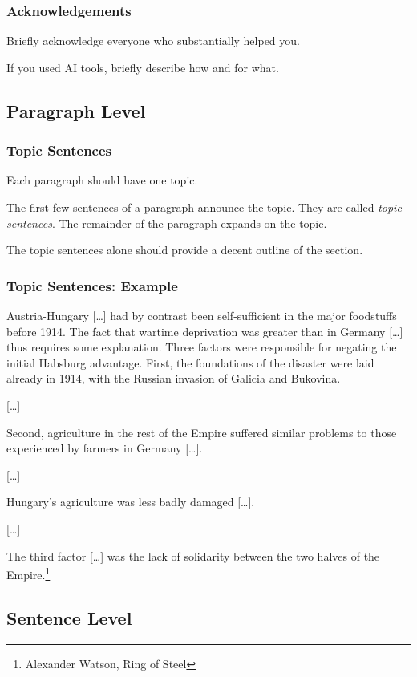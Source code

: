 \documentclass[xetex]{beamer}
\begin{document}
\begin{frame}
  \frametitle{Acknowledgements}

  Briefly acknowledge everyone who substantially helped you.

  \medskip

  If you used AI tools, briefly describe how and for what.
\end{frame}

\subsection{Paragraph Level}

\begin{frame}
  \frametitle{Topic Sentences}

  Each paragraph should have one topic.

  \medskip

  The first few sentences of a paragraph announce the topic.
  They are called \emph{topic sentences}.
  The remainder of the paragraph expands on the topic.

  \medskip

  The topic sentences alone should provide a decent outline of the section.
\end{frame}

\begin{frame}
  \frametitle{Topic Sentences: Example}

  \small
  Austria-Hungary [\dots] had by contrast been self-sufficient in the major foodstuffs before 1914.
  The fact that wartime deprivation was greater than in Germany [\dots] thus requires some explanation.
  Three factors were responsible for negating the initial Habsburg advantage.
  First, the foundations of the disaster were laid already in 1914, with the Russian invasion of Galicia and Bukovina.

  [\dots]

  Second, agriculture in the rest of the Empire suffered similar problems to those experienced by farmers in Germany [\dots].

  [\dots]

  Hungary's agriculture was less badly damaged [\dots].

  [\dots]

  The third factor [\dots] was the lack of solidarity between the two halves of the Empire.\footnote{Alexander Watson, Ring of Steel}
\end{frame}

\subsection{Sentence Level}
\end{document}

